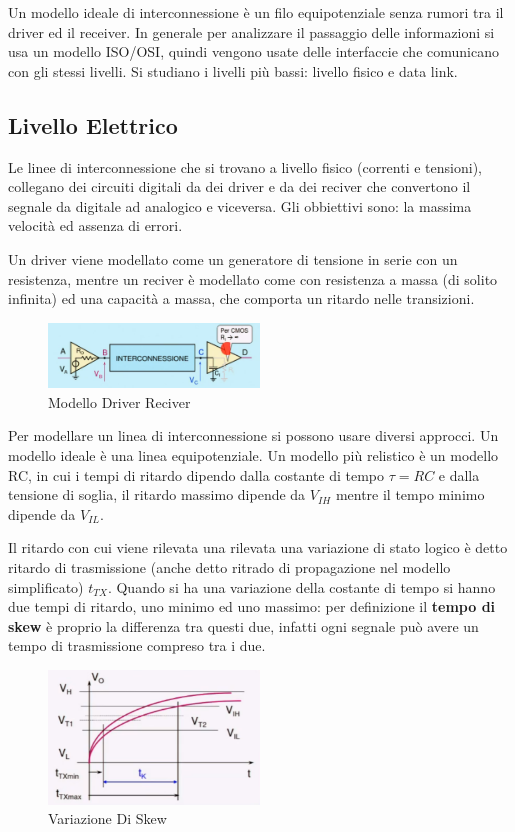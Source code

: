 \documentclass[12pt]{article}
\begin{document}
Un modello ideale di interconnessione \`e un filo equipotenziale senza rumori tra il driver ed il receiver. In generale per analizzare il passaggio delle informazioni si usa un modello ISO/OSI, quindi vengono usate delle interfaccie che comunicano con gli stessi livelli. Si studiano i livelli pi\`u bassi: livello fisico e data link. 

\subsection{Livello Elettrico}
Le linee di interconnessione che si trovano a livello fisico (correnti e tensioni), collegano dei circuiti digitali da dei driver e da dei reciver che convertono il segnale da digitale ad analogico e viceversa. Gli obbiettivi sono: la massima velocit\`a ed assenza di errori. 

Un driver viene modellato come un generatore di tensione in serie con un resistenza, mentre un reciver \`e modellato come con resistenza a massa (di solito infinita) ed una capacit\`a a massa, che comporta un ritardo nelle transizioni.
\begin{figure}[H]
    \centering
    \includegraphics[width=0.5\textwidth]{modello_driver_reciver.png}
    \caption{Modello Driver Reciver}
    \label{fig:modello_driver_reciver}
\end{figure}

Per modellare un linea di interconnessione si possono usare diversi approcci. Un modello ideale \`e una linea equipotenziale. Un modello pi\`u relistico \`e un modello RC, in cui i tempi di ritardo dipendo dalla costante di tempo $\tau = RC$ e dalla tensione di soglia, il ritardo massimo dipende da $V _{IH}$ mentre il tempo minimo dipende da $V _{IL}$.

Il ritardo con cui viene rilevata una rilevata una variazione di stato logico \`e detto ritardo di trasmissione (anche detto ritrado di propagazione nel modello simplificato) $t _{TX}$. Quando si ha una variazione della costante di tempo si hanno due tempi di ritardo, uno minimo ed uno massimo: per definizione il \textbf{tempo di skew} \`e proprio la differenza tra questi due, infatti ogni segnale pu\`o avere un tempo di trasmissione compreso tra i due.
\begin{figure}[H]
    \centering
    \includegraphics[width=0.5\textwidth]{variazione_di_ttx.png}
    \caption{Variazione Di Skew}
    \label{fig:variazione_di_skew}
\end{figure}
\end{document}
